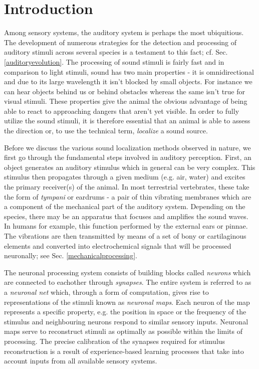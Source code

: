 \chapter{Introduction}\label{introchapter}
Among sensory systems, the auditory system is perhaps the most ubiquitious. The 
development of numerous strategies for the detection and processing of auditory stimuli
across several species is a testament to this fact; cf. Sec. \ref{auditoryevolution}. The processing of sound stimuli is fairly fast and in comparison
to light stimuli, sound has two main properties - it is omnidirectional and due to
its large wavelength it isn't blocked by small objects. For instance we can hear objects
behind us or behind obstacles whereas the same isn't true for visual stimuli. These properties 
give the animal the obvious advantage of being able to react to approaching dangers that
aren't yet visible. In order to fully utilize the sound stimuli, it is therefore essential
that an animal is able to assess the direction or, to use the technical term, \emph{localize} a sound source.

Before we discuss the various sound localization methods observed in nature, we first
go through the fundamental steps involved in auditory perception. First, an object generates
an auditory stimulus which in general can be very complex. This stimulus then propagates
through a given medium (e.g. air, water) and excites the primary receiver(s) of the animal. In most
terrestrial vertebrates, these take the form of \emph{tympani} or eardrums - a pair of thin vibrating
membranes which are a component of the mechanical part of the auditory system.
Depending on the species, there may be an apparatus that focuses and amplifies the sound waves. In
humans for example, this function performed by the external ears or pinnae. 
The vibrations are then transmitted by means of a set of bony or cartilaginous elements and
converted into electrochemical signals that will be processed neuronally; see Sec. \ref{mechanicalprocessing}.

The neuronal processing system consists of building blocks called \emph{neurons} which are
connected to eachother through \emph{synapses}. The entire system is referred to as a 
\emph{neuronal net} which, through a form of computation, gives rise to representations of the stimuli
known as \emph{neuronal maps}. Each neuron of the map represents a specific property, e.g.
the position in space or the frequency of the stimulus and neighbouring neurons respond to
similar sensory inputs. Neuronal maps serve to reconstruct stimuli as optimally as possible
within the limits of processing. The precise calibration of the
synapses required for stimulus reconstruction is a result of experience-based learning
processes that take into account inputs from all available sensory systems.


